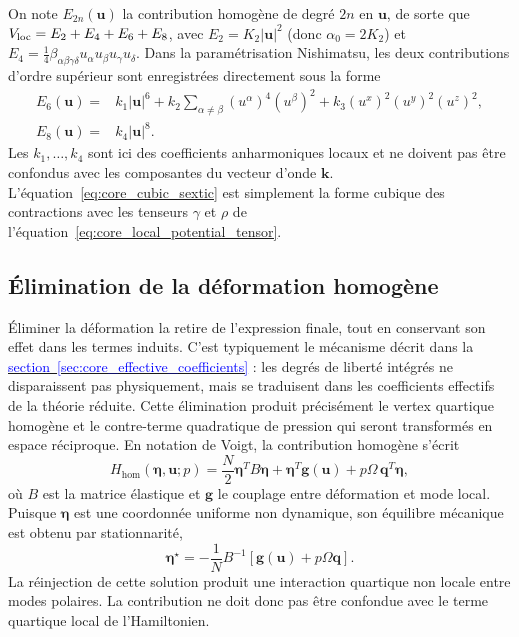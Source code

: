 On note $E_{2n}(\mathbf u)$
la contribution homogène de degré $2n$ en $\mathbf u$, de sorte que
$V_{\rm loc}=E_2+E_4+E_6+E_8$, avec
$E_2=K_2|\mathbf u|^2$ (donc $\alpha_0=2K_2$) et
$E_4=\tfrac14\beta_{\alpha\beta\gamma\delta}
u_\alpha u_\beta u_\gamma u_\delta$. Dans la paramétrisation Nishimatsu, les
deux contributions d'ordre supérieur sont enregistrées directement sous la
forme
\begin{equation}
\begin{aligned}
E_6(\mathbf u)={}&k_1|\mathbf u|^6
+k_2\sum_{\alpha\ne\beta}(u^\alpha)^4(u^\beta)^2
+k_3(u^x)^2(u^y)^2(u^z)^2,\\
E_8(\mathbf u)={}&k_4|\mathbf u|^8.
\end{aligned}
\label{eq:core_cubic_sextic}
\end{equation}
Les $k_1,\ldots,k_4$ sont ici des coefficients anharmoniques locaux et ne
doivent pas être confondus avec les composantes du vecteur d'onde $\mathbf k$.
L'équation~\eqref{eq:core_cubic_sextic} est simplement la forme cubique des
contractions avec les tenseurs $\gamma$ et $\rho$ de
l'équation~\eqref{eq:core_local_potential_tensor}.

\subsection{Élimination de la déformation homogène}

Éliminer la déformation la retire de l'expression finale, tout en conservant son
effet dans les termes induits.
C'est typiquement le mécanisme décrit dans la
\hyperref[sec:core_effective_coefficients]{\textcolor{blue}{section~\ref*{sec:core_effective_coefficients}}} :
les degrés de liberté intégrés ne disparaissent pas physiquement, mais se
traduisent dans les coefficients effectifs de la théorie réduite. Cette
élimination produit précisément le vertex quartique homogène et le contre-terme
quadratique de pression qui seront transformés en espace réciproque. En
notation de Voigt, la contribution homogène s'écrit
\begin{equation}
H_{\mathrm{hom}}(\boldsymbol\eta,\mathbf u;p)
=\frac{N}{2}\boldsymbol\eta^{T}B\boldsymbol\eta
+\boldsymbol\eta^{T}\mathbf g(\mathbf u)
+p\Omega\,\mathbf q^{T}\boldsymbol\eta,
\label{eq:ann_homogene}
\end{equation}
où $B$ est la matrice élastique et $\mathbf g$ le couplage entre déformation et
mode local. Puisque $\boldsymbol\eta$ est une coordonnée uniforme non
dynamique, son équilibre mécanique est obtenu par stationnarité,
\begin{equation}
\boldsymbol\eta^{\star}
=-\frac{1}{N}B^{-1}\!\left[\mathbf g(\mathbf u)
+p\Omega\mathbf q\right].
\label{eq:ann_eta_stationnaire}
\end{equation}
La réinjection de cette solution produit une interaction quartique non locale
entre modes polaires. La contribution ne doit donc pas être confondue avec le
terme quartique local de l'Hamiltonien.

